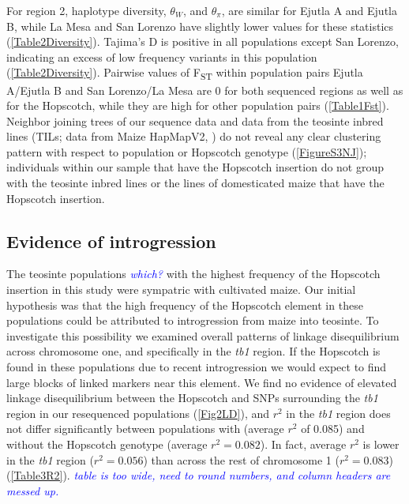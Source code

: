 \documentclass[12pt]{article}
\newcommand{\jri}[1]{\textcolor{blue}{ \emph{\scriptsize  #1}} }
\begin{document}
For region 2, haplotype diversity, $\theta_W$, and $\theta_\pi$, are similar for Ejutla A and Ejutla B, while La Mesa and San Lorenzo have slightly lower values for these statistics (\ref{Table2Diversity}). Tajima's D is positive in all populations except San Lorenzo, indicating an excess of low frequency variants in this population (\ref{Table2Diversity}). Pairwise values of F\textsubscript{ST} within population pairs Ejutla A/Ejutla B and San Lorenzo/La Mesa are 0 for both sequenced regions as well as for the Hopscotch, while they are high for other population pairs (\ref{Table1Fst}). Neighbor joining trees of our sequence data and data from the teosinte inbred lines (TILs; data from Maize HapMapV2, \citep{Chia2012}) do not reveal any clear clustering pattern with respect to population or Hopscotch genotype (\ref{FigureS3NJ}); individuals within our sample that have the Hopscotch insertion do not group with the teosinte inbred lines or the lines of domesticated maize that have the Hopscotch insertion. 

\subsection*{Evidence of introgression}

The teosinte populations \jri{which?} with the highest frequency of the Hopscotch insertion in this study were sympatric with cultivated maize. Our initial hypothesis was that the high frequency of the Hopscotch element in these populations could be attributed to introgression from maize into teosinte. To investigate this possibility we examined overall patterns of linkage disequilibrium across chromosome one, and specifically in the \emph{tb1} region. If the Hopscotch is found in these populations due to recent introgression we would expect to find large blocks of linked markers near this element. We find no evidence of elevated linkage disequilibrium between the Hopscotch and SNPs surrounding the \emph{tb1} region in our resequenced populations (\ref{Fig2LD}), and $r^{2}$ in the \emph{tb1} region  does not differ significantly between populations with (average $r^{2}$ of 0.085) and without the Hopscotch genotype (average $r^{2}=0.082$). In fact, average $r^{2}$ is lower in the \emph{tb1} region ($r^{2}=0.056$) than across the rest of chromosome 1 ($r^{2}=0.083$) (\ref{Table3R2}). \jri{table is too wide, need to round numbers, and column headers are messed up.}
\end{document}
